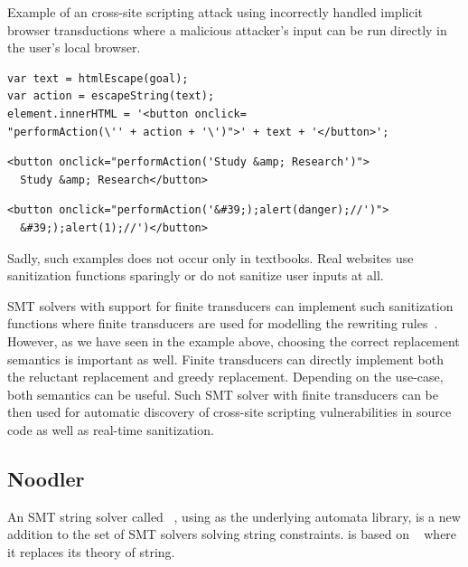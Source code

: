 \begin{listing}[!ht]
\caption{Example of an cross-site scripting attack using incorrectly handled implicit browser transductions where a malicious attacker's input can be run directly in the user's local browser.}
\label{listing:not_sanitized_implicit_browser_transductions_example}

    \begin{verbatim}
var text = htmlEscape(goal);
var action = escapeString(text);
element.innerHTML = '<button onclick=
"performAction(\'' + action + '\')">' + text + '</button>';
    \end{verbatim}

    \begin{verbatim}
<button onclick="performAction('Study &amp; Research')">
  Study &amp; Research</button>
    \end{verbatim}

    \begin{verbatim}
<button onclick="performAction('&#39;);alert(danger);//')">
  &#39;);alert(1);//')</button>
    \end{verbatim}
\end{listing}

Sadly, such examples does not occur only in textbooks. Real websites use sanitization functions sparingly or do not sanitize user inputs at all.

SMT solvers with support for finite transducers can implement such sanitization functions where finite transducers are used for modelling the rewriting rules~\cite{rewriting_rules_kaplan94, rewriting_rules_karttunen97}.
However, as we have seen in the example above, choosing the correct replacement semantics is important as well.
Finite transducers can directly implement both the reluctant replacement and greedy replacement.
Depending on the use-case, both semantics can be useful.
Such SMT solver with finite transducers can be then used for automatic discovery of cross-site scripting vulnerabilities in source code as well as real-time sanitization.

\subsection{Noodler}

An SMT string solver called \noodler~\cite{fm23_equations_synergy_regular_constraints_DBLP:conf/fm/BlahoudekCCHHLS23, oopsla23_stabilization_DBLP:journals/pacmpl/ChenCHHLS23,tacas24_noodler_10.1007/978-3-031-57246-3_2}, using \mata as the underlying automata library, is a new addition to the set of SMT solvers solving string constraints.
\noodler is based on \ziii~\cite{z3} where it replaces its theory of string.

